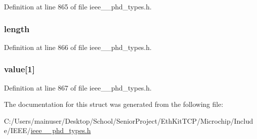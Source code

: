 Definition at line 865 of file ieee\+\_\+\_\+phd\+\_\+types.\+h.

\hypertarget{struct___metric_id_list_a3743679e4ff85e3e1b3fc2e59973fbb3}{}
\subsubsection[{length}]{ length}\label{struct___metric_id_list_a3743679e4ff85e3e1b3fc2e59973fbb3}


Definition at line 866 of file ieee\+\_\+\_\+phd\+\_\+types.\+h.

\hypertarget{struct___metric_id_list_a33f73b3d426a499e63aae9644dd8813a}{}
\subsubsection[{value}]{ value\mbox{[}1\mbox{]}}\label{struct___metric_id_list_a33f73b3d426a499e63aae9644dd8813a}


Definition at line 867 of file ieee\+\_\+\_\+phd\+\_\+types.\+h.



The documentation for this struct was generated from the following file\+:\begin{DoxyCompactItemize}
\item 
C\+:/\+Users/mainuser/\+Desktop/\+School/\+Senior\+Project/\+Eth\+Kit\+T\+C\+P/\+Microchip/\+Include/\+I\+E\+E\+E/\hyperlink{ieee__11073__phd__types_8h}{ieee\+\_\+\_\+phd\+\_\+types.\+h}\end{DoxyCompactItemize}
